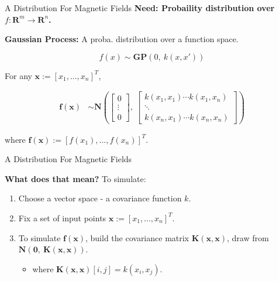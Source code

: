 \documentclass{beamer}
\begin{document}
\begin{frame}{A Distribution For Magnetic Fields}
  \textbf{Need: Probaility distribution over $f: \mathbf{R}^m \rightarrow \mathbf{R}^n$.}

  \textbf{Gaussian Process:} A proba. distribution over a function space.

  \begin{equation*}
    f(x) \sim \mathbf{GP}\left( 0,\ k(x, x')\right)
  \end{equation*}

  For any $\mathbf{x} := [x_1, ... , x_n]^T$,

  \begin{align*}
    \mathbf{f(x)} &\sim
    \mathbf{N}
    \left(
    \begin{bmatrix} 0 \\ \vdots \\ 0 \end{bmatrix}, \
    \begin{bmatrix}
      k(x_1, x_1) \cdots  k(x_1, x_n)\\
      \ddots \\
      k(x_n, x_1) \cdots  k(x_n, x_n)
    \end{bmatrix}
    \right)
  \end{align*}

  where $\mathbf{f(x)} := [f(x_1), ... , f(x_n)]^T$.

\end{frame}


\begin{frame}{A Distribution For Magnetic Fields}

  \textbf{What does that mean?} To simulate:

  \begin{enumerate}
    \setlength\itemsep{1em}
    \item Choose a vector space - a covariance function $k$.
    \item Fix a set of input points $\mathbf{x} := [x_1, ... , x_n]^T$.
    \item To simulate $\mathbf{f(x)}$, build the covariance matrix $\mathbf{K(x, x)}$, draw from $\mathbf{N\left(0, \ K(x, x)\right)}$.
    \vspace{1em}
    \begin{itemize}
      \item[] where $\mathbf{K(x, x)}[i, j] = k(x_i, x_j).$
    \end{itemize}
  \end{enumerate}

\end{frame}
\end{document}

